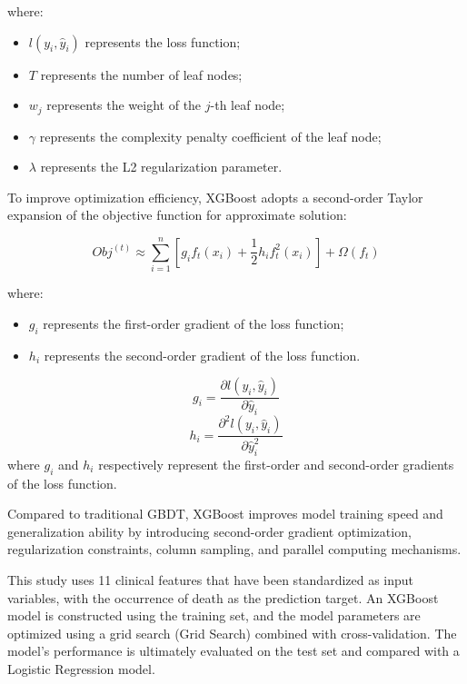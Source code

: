 \documentclass[11pt,a4paper]{article}
\begin{document}
where:

\begin{itemize}
\item $l(y_i,\hat{y}_i)$ represents the loss function;
\item $T$ represents the number of leaf nodes;
\item $w_j$ represents the weight of the $j$-th leaf node;
\item $\gamma$ represents the complexity penalty coefficient of the leaf node;
\item $\lambda$ represents the L2 regularization parameter.
\end{itemize}

To improve optimization efficiency, XGBoost adopts a second-order Taylor expansion of the objective function for approximate solution:

\begin{equation}
Obj^{(t)}
\approx
\sum_{i=1}^{n}
\left[
g_i f_t(x_i)
+
\frac{1}{2}
h_i f_t^2(x_i)
\right]
+
\Omega(f_t)
\end{equation}

where:
\begin{itemize}
\item $g_i$ represents the first-order gradient of the loss function;
\item $h_i$ represents the second-order gradient of the loss function.
\end{itemize}

\begin{equation}
g_i
=
\frac{\partial l(y_i,\hat{y}_i)}
{\partial \hat{y}_i}
\end{equation}
\begin{equation}
h_i
=
\frac{\partial^2 l(y_i,\hat{y}_i)}
{\partial \hat{y}_i^2}
\end{equation}
where $g_i$ and $h_i$ respectively represent the first-order and second-order gradients of the loss function.

Compared to traditional GBDT, XGBoost improves model training speed and generalization ability by introducing second-order gradient optimization, regularization constraints, column sampling, and parallel computing mechanisms.

This study uses 11 clinical features that have been standardized as input variables, with the occurrence of death as the prediction target. An XGBoost model is constructed using the training set, and the model parameters are optimized using a grid search (Grid Search) combined with cross-validation. The model's performance is ultimately evaluated on the test set and compared with a Logistic Regression model.
\end{document}
